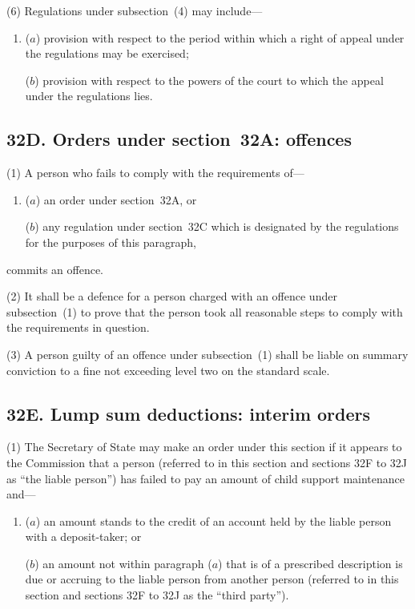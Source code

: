 \documentclass[12pt,a4paper]{article}
\begin{document}
(6)
Regulations under subsection~(4) may include---
\begin{enumerate}\item[]
($a$) provision with respect to the period within which a right of appeal under the regulations may be exercised;

($b$) provision with respect to the powers of the court to which the appeal under the regulations lies.
\end{enumerate}

\subsection{32D. Orders under section~32A: offences}

(1) A person who fails to comply with the requirements of---
\begin{enumerate}\item[]
($a$) an order under section~32A, or

($b$) any regulation under section~32C which is designated by the regulations for
the purposes of this paragraph, 
\end{enumerate}
commits an offence.

(2)
It shall be a defence for a person charged with an offence under subsection~(1) to prove that the person took all reasonable steps to comply with the requirements in question.

(3)
A person guilty of an offence under subsection~(1) shall be liable on summary conviction to a fine not exceeding level two on the standard scale.


\subsection{32E. Lump sum deductions: interim orders}

(1) The Secretary of State may make an order under this section if it appears to the Commission that a person (referred to in this section and sections 32F to 32J as “the liable person”) has failed to pay an amount of child support maintenance and---
\begin{enumerate}\item[]
($a$) an amount stands to the credit of an account held by the liable person with a deposit-taker; or

($b$) an amount not within paragraph ($a$) that is of a prescribed description is due or accruing to the liable person from another person (referred to in this section and sections 32F to 32J as the “third party”).
\end{enumerate}
\end{document}
